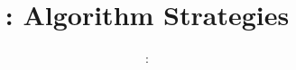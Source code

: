 \usepackage{../../beamerthemeFalmouthGamesAcademy}
\usepackage{multimedia}
\graphicspath{ {../../} }

\lstset{language=Python
}

\usepackage[normalem]{ulem}
\usepackage{wasysym}

\usepackage{algpseudocode}

\usepackage{pdfpages}

\usetikzlibrary{arrows,automata}
\usetikzlibrary{tikzmark,calc}




\title{\sessionnumber: Algorithm Strategies}
\subtitle{\modulecode: \moduletitle}

\frame{\titlepage} 





%



